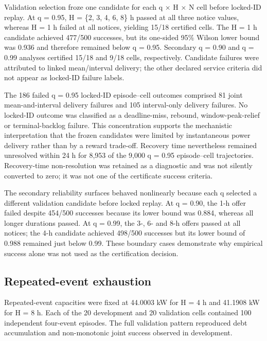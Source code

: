 \documentclass[10pt,a4paper]{article}
\begin{document}
Validation selection froze one candidate for each q × H × N cell before locked-ID replay. At q = 0.95, H = \{2, 3, 4, 6, 8\} h passed at all three notice values, whereas H = 1 h failed at all notices, yielding 15/18 certified cells. The H = 1 h candidate achieved 477/500 successes, but its one-sided 95\% Wilson lower bound was 0.936 and therefore remained below q = 0.95. Secondary q = 0.90 and q = 0.99 analyses certified 15/18 and 9/18 cells, respectively. Candidate failures were attributed to linked mean/interval delivery; the other declared service criteria did not appear as locked-ID failure labels.


The 186 failed q = 0.95 locked-ID episode–cell outcomes comprised 81 joint mean-and-interval delivery failures and 105 interval-only delivery failures. No locked-ID outcome was classified as a deadline-miss, rebound, window-peak-relief or terminal-backlog failure. This concentration supports the mechanistic interpretation that the frozen candidates were limited by instantaneous power delivery rather than by a reward trade-off. Recovery time nevertheless remained unresolved within 24 h for 8,953 of the 9,000 q = 0.95 episode–cell trajectories. Recovery-time non-resolution was retained as a diagnostic and was not silently converted to zero; it was not one of the certificate success criteria.


The secondary reliability surfaces behaved nonlinearly because each q selected a different validation candidate before locked replay. At q = 0.90, the 1-h offer failed despite 454/500 successes because its lower bound was 0.884, whereas all longer durations passed. At q = 0.99, the 3-, 6- and 8-h offers passed at all notices; the 4-h candidate achieved 498/500 successes but its lower bound of 0.988 remained just below 0.99. These boundary cases demonstrate why empirical success alone was not used as the certification decision.


\subsection{Repeated-event exhaustion}

Repeated-event capacities were fixed at 44.0003 kW for H = 4 h and 41.1908 kW for H = 8 h. Each of the 20 development and 20 validation cells contained 100 independent four-event episodes. The full validation pattern reproduced debt accumulation and non-monotonic joint success observed in development.
\end{document}
